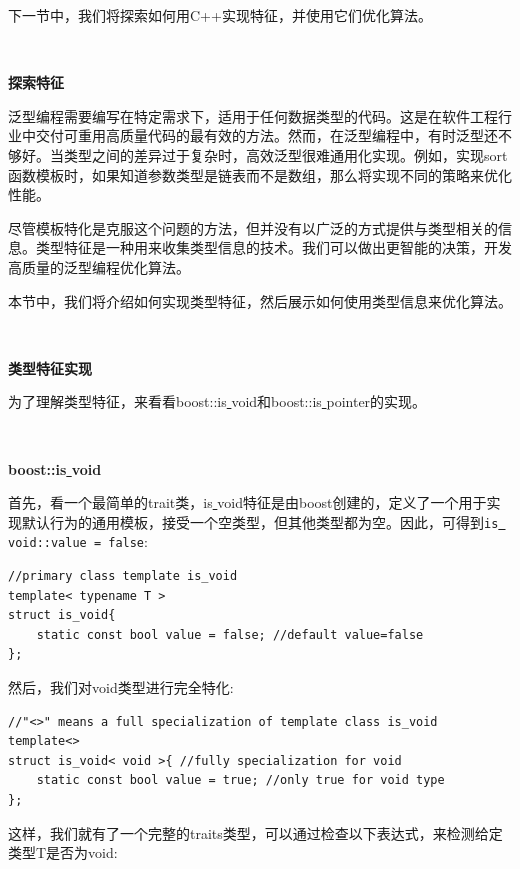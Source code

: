 \newpage

下一节中，我们将探索如何用C++实现特征，并使用它们优化算法。 \par

\noindent\textbf{}\ \par
\textbf{探索特征} \ \par
泛型编程需要编写在特定需求下，适用于任何数据类型的代码。这是在软件工程行业中交付可重用高质量代码的最有效的方法。然而，在泛型编程中，有时泛型还不够好。当类型之间的差异过于复杂时，高效泛型很难通用化实现。例如，实现sort函数模板时，如果知道参数类型是链表而不是数组，那么将实现不同的策略来优化性能。 \par
尽管模板特化是克服这个问题的方法，但并没有以广泛的方式提供与类型相关的信息。类型特征是一种用来收集类型信息的技术。我们可以做出更智能的决策，开发高质量的泛型编程优化算法。 \par
本节中，我们将介绍如何实现类型特征，然后展示如何使用类型信息来优化算法。 \par

\noindent\textbf{}\ \par
\textbf{类型特征实现} \ \par
为了理解类型特征，来看看boost::is\underline{ }void和boost::is\underline{ }pointer的实现。\par

\noindent\textbf{}\ \par
\textbf{boost::is\underline{ }void} \ \par
首先，看一个最简单的trait类，is\underline{ }void特征是由boost创建的，定义了一个用于实现默认行为的通用模板，接受一个空类型，但其他类型都为空。因此，可得到\texttt{is\underline{ }void::value = false}: \par

\begin{lstlisting}[caption={}]
//primary class template is_void
template< typename T >
struct is_void{
	static const bool value = false; //default value=false
};
\end{lstlisting}

然后，我们对void类型进行完全特化:\par

\begin{lstlisting}[caption={}]
//"<>" means a full specialization of template class is_void
template<>
struct is_void< void >{ //fully specialization for void
	static const bool value = true; //only true for void type
};
\end{lstlisting}

这样，我们就有了一个完整的traits类型，可以通过检查以下表达式，来检测给定类型T是否为void: \par

